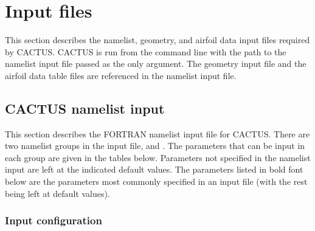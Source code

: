 \chapter{Input files}
This section describes the namelist, geometry, and airfoil data input files required by CACTUS. CACTUS is run from the command line with the path to the namelist input file passed as the only argument. The geometry input file and the airfoil data table files are referenced in the namelist input file.

\section{CACTUS namelist input}
This section describes the FORTRAN namelist input file for CACTUS. There are two namelist groups in the input file,  and . The parameters that can be input in each group are given in the tables below. Parameters not specified in the namelist input are left at the indicated default values. The parameters listed in bold font below are the parameters most commonly specified in an input file (with the rest being left at default values).
\subsection{Input configuration}

